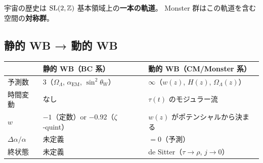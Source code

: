 宇宙の歴史は $\mathrm{SL}(2,\mathbb{Z})$ 基本領域上の\textbf{一本の軌道}。
Monster 群はこの軌道を含む空間の\textbf{対称群}。

\subsection{静的 WB → 動的 WB}

\begin{center}
\begin{tabular}{lll}
\toprule
& 静的 WB（BC 系） & 動的 WB（CM/Monster 系） \\
\midrule
予測数 & 3（$\Omega_\Lambda$, $\alpha_{\mathrm{EM}}$, $\sin^2\theta_W$） &
  $\infty$（$w(z)$, $H(z)$, $\Omega_\Lambda(z)$） \\
時間変動 & なし & $\tau(t)$ のモジュラー流 \\
$w$ & $-1$（定数）or $-0.92$（$\zeta$-quint） &
  $w(z)$ がポテンシャルから決まる \\
$\Delta\alpha/\alpha$ & 未定義 & $= 0$（予測） \\
終状態 & 未定義 & de Sitter（$\tau \to \rho$, $j \to 0$） \\
\bottomrule
\end{tabular}
\end{center}

\newpage
